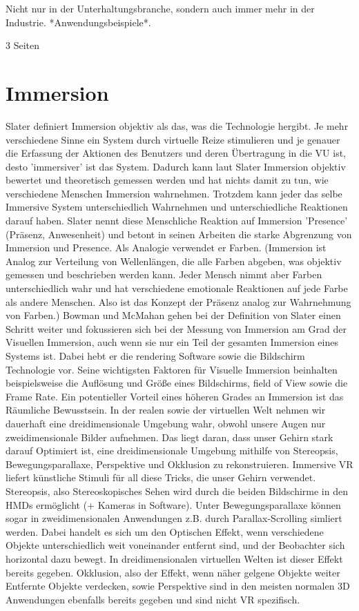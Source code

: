 Nicht nur in der Unterhaltungsbranche, sondern auch immer mehr in der Industrie.\cite{Ragan2010} *Anwendungsbeispiele*.
 


3 Seiten
\section{Immersion}
Slater\cite{Slater2003}\cite{Slater1999} definiert Immersion objektiv als das, was die Technologie hergibt. Je mehr verschiedene Sinne ein System durch virtuelle Reize stimulieren und je genauer die Erfassung der Aktionen des Benutzers und deren Übertragung in die VU ist, desto 'immersiver' ist das System. Dadurch kann laut Slater Immersion objektiv bewertet und theoretisch gemessen werden und hat nichts damit zu tun, wie verschiedene Menschen Immersion wahrnehmen. Trotzdem kann jeder das selbe Immersive System unterschiedlich Wahrnehmen und unterschiedliche Reaktionen darauf haben. Slater nennt diese Menschliche Reaktion auf Immersion 'Presence' (Präsenz, Anwesenheit) und betont in seinen Arbeiten die starke Abgrenzung von Immersion und Presence. Als Analogie verwendet er Farben. (Immersion ist Analog zur Verteilung von Wellenlängen, die alle Farben abgeben, was objektiv gemessen und beschrieben werden kann. Jeder Mensch nimmt aber Farben unterschiedlich wahr und hat verschiedene emotionale Reaktionen auf jede Farbe als andere Menschen. Also ist das Konzept der Präsenz analog zur Wahrnehmung von Farben.)
Bowman und McMahan\cite{Bowman2007} gehen bei der Definition von Slater einen Schritt weiter und fokussieren sich bei der Messung von Immersion am Grad der Visuellen Immersion, auch wenn sie nur ein Teil der gesamten Immersion eines Systems ist. Dabei hebt er die rendering Software sowie die Bildschirm Technologie vor. Seine wichtigsten Faktoren für Visuelle Immersion beinhalten beispielsweise die Auflösung und Größe eines Bildschirms, field of View sowie die Frame Rate.
Ein potentieller Vorteil eines höheren Grades an Immersion ist das Räumliche Bewusstsein. In der realen sowie der virtuellen Welt nehmen wir dauerhaft eine dreidimensionale Umgebung wahr, obwohl unsere Augen nur zweidimensionale Bilder aufnehmen. Das liegt daran, dass unser Gehirn stark darauf Optimiert ist, eine dreidimensionale Umgebung mithilfe von Stereopsis, Bewegungsparallaxe, Perspektive und Okklusion zu rekonstruieren. 
Immersive VR liefert künstliche Stimuli für all diese Tricks, die unser Gehirn verwendet. Stereopsis, also Stereoskopisches Sehen wird durch die beiden Bildschirme in den HMDs ermöglicht (+ Kameras in Software). Unter Bewegungsparallaxe können sogar in zweidimensionalen Anwendungen z.B. durch Parallax-Scrolling simliert werden. Dabei handelt es sich um den Optischen Effekt, wenn verschiedene Objekte unterschiedlich weit voneinander entfernt sind, und der Beobachter sich horizontal dazu bewegt. In dreidimensionalen virtuellen Welten ist dieser Effekt bereits gegeben. Okklusion, also der Effekt, wenn näher gelgene Objekte weiter Entfernte Objekte verdecken, sowie Perspektive sind in den meisten normalen 3D Anwendungen ebenfalls bereits gegeben und sind nicht VR spezifisch.
